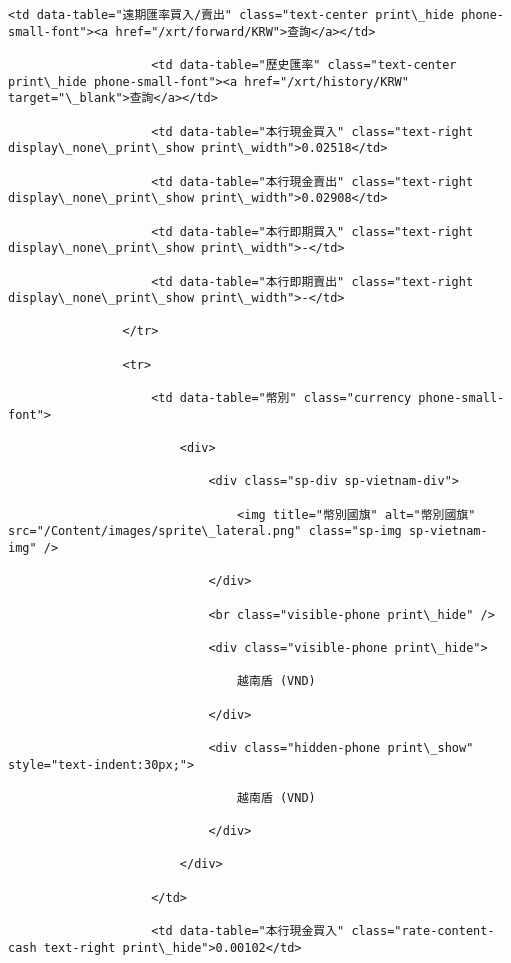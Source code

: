 \documentclass[11pt]{article}
\begin{document}
\begin{Verbatim}[commandchars=\\\{\}]
                    <td data-table="遠期匯率買入/賣出" class="text-center print\_hide phone-small-font"><a href="/xrt/forward/KRW">查詢</a></td>

                    <td data-table="歷史匯率" class="text-center print\_hide phone-small-font"><a href="/xrt/history/KRW" target="\_blank">查詢</a></td>

                    <td data-table="本行現金買入" class="text-right display\_none\_print\_show print\_width">0.02518</td>

                    <td data-table="本行現金賣出" class="text-right display\_none\_print\_show print\_width">0.02908</td>

                    <td data-table="本行即期買入" class="text-right display\_none\_print\_show print\_width">-</td>

                    <td data-table="本行即期賣出" class="text-right display\_none\_print\_show print\_width">-</td>

                </tr>

                <tr>

                    <td data-table="幣別" class="currency phone-small-font">

                        <div>

                            <div class="sp-div sp-vietnam-div">

                                <img title="幣別國旗" alt="幣別國旗" src="/Content/images/sprite\_lateral.png" class="sp-img sp-vietnam-img" />

                            </div>

                            <br class="visible-phone print\_hide" />

                            <div class="visible-phone print\_hide">

                                越南盾 (VND)

                            </div>

                            <div class="hidden-phone print\_show" style="text-indent:30px;">

                                越南盾 (VND)

                            </div>

                        </div>

                    </td>

                    <td data-table="本行現金買入" class="rate-content-cash text-right print\_hide">0.00102</td>


\end{Verbatim}
\end{document}
